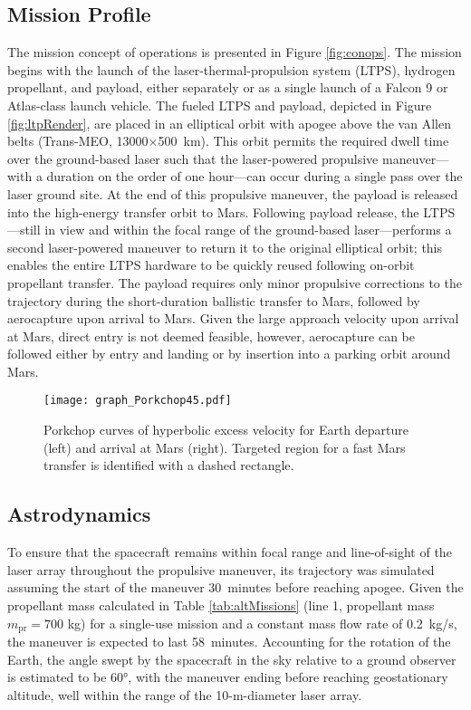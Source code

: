\documentclass[final,3p,times,twocolumn,sort&compress, lefttitle]{elsarticle}
\begin{document}
        \subsection{Mission Profile}
            The mission concept of operations is presented in Figure \ref{fig:conops}. The mission begins with the launch of the laser-thermal-propulsion system (LTPS), hydrogen propellant, and payload, either separately or as a single launch of a Falcon 9 or Atlas-class launch vehicle. The fueled LTPS and payload, depicted in Figure \ref{fig:ltpRender}, are placed in an elliptical orbit with apogee above the van Allen belts (Trans-MEO, 13000$\times$500~km). This orbit permits the required dwell time over the ground-based laser such that the laser-powered propulsive maneuver---with a duration on the order of one hour---can occur during a single pass over the laser ground site. At the end of this propulsive maneuver, the payload is released into the high-energy transfer orbit to Mars. Following payload release, the LTPS---still in view and within the focal range of the ground-based laser---performs a second laser-powered maneuver to return it to the original elliptical orbit; this enables the entire LTPS hardware to be quickly reused following on-orbit propellant transfer. The payload requires only minor propulsive corrections to the trajectory during the short-duration ballistic transfer to Mars, followed by aerocapture upon arrival to Mars. Given the large approach velocity upon arrival at Mars, direct entry is not deemed feasible, however, aerocapture can be followed either by entry and landing or by insertion into a parking orbit around Mars.
            
            \begin{figure}[ht]
                \centering
                \texttt{[image: graph\_Porkchop45.pdf]}
                \caption{Porkchop curves of hyperbolic excess velocity for Earth departure (left) and arrival at Mars (right). Targeted region for a fast Mars transfer is identified with a dashed rectangle.}
                \label{fig:porkchop}
            \end{figure}
            
        \subsection{Astrodynamics}
            To ensure that the spacecraft remains within focal range and line-of-sight of the laser array throughout the propulsive maneuver, its trajectory was simulated assuming the start of the maneuver 30~minutes before reaching apogee. Given the propellant mass calculated in Table \ref{tab:altMissions} (line 1, propellant mass $m_\text{pr} = 700$ kg) for a single-use mission and a constant mass flow rate of 0.2~kg/s, the maneuver is expected to last 58~minutes. Accounting for the rotation of the Earth, the angle swept by the spacecraft in the sky relative to a ground observer is estimated to be 60°, with the maneuver ending before reaching geostationary altitude, well within the range of the 10-m-diameter laser array.
            
\end{document}

